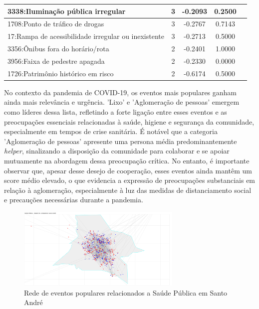 \begin{table}[htbp]
\begin{tabular}{|l|c|c|c|c|}
		\hline
		3338:Iluminação pública irregular                     & 3                & -0.2093        & 0.2500           \\
		\hline
		1708:Ponto de tráfico de drogas                       & 3                & -0.2767        & 0.7143           \\
		\hline
		17:Rampa de acessibilidade irregular ou inexistente   & 3                & -0.2713        & 0.5000           \\
		\hline
		3356:Ônibus fora do horário/rota                      & 2                & -0.2401        & 1.0000           \\
		\hline
		3956:Faixa de pedestre apagada                        & 2                & -0.2330        & 0.0000           \\
		\hline
		1726:Patrimônio histórico em risco                    & 2                & -0.6174        & 0.5000           \\
		\hline
	\end{tabular}
\end{table}

No contexto da pandemia de COVID-19, os eventos mais populares ganham ainda mais relevância e urgência. 'Lixo' e 'Aglomeração de pessoas' emergem como líderes dessa lista, refletindo a forte ligação entre esses eventos e as preocupações essenciais relacionadas à saúde, higiene e segurança da comunidade, especialmente em tempos de crise sanitária. É notável que a categoria 'Aglomeração de pessoas' apresente uma persona média predominantemente \textit{helper}, sinalizando a disposição da comunidade para colaborar e se apoiar mutuamente na abordagem dessa preocupação crítica. No entanto, é importante observar que, apesar desse desejo de cooperação, esses eventos ainda mantêm um score médio elevado, o que evidencia a expressão de preocupações substanciais em relação à aglomeração, especialmente à luz das medidas de distanciamento social e precauções necessárias durante a pandemia.

\begin{figure}[htb]
	\centering
	\includegraphics[width=0.7\textwidth]{images/network_santo_andre_personas_map.png}
	\caption{Rede de eventos populares relacionados a Saúde Pública em Santo André}
	\label{fig:network_santo_andre_personas_map}
\end{figure}

